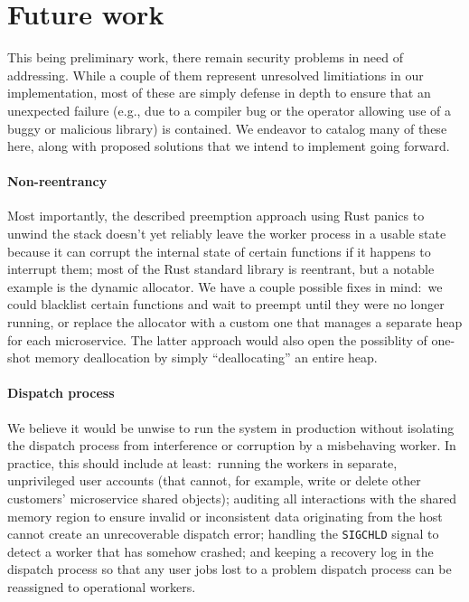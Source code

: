 \section{Future work}
\label{sec:future}

This being preliminary work, there remain security problems in need of addressing.
While a couple of them represent unresolved limitiations in our implementation, most
of these are simply defense in depth to ensure that an unexpected failure (e.g., due
to a compiler bug or the operator allowing use of a buggy or malicious library) is
contained.  We endeavor to catalog many of these here, along with proposed solutions
that we intend to implement going forward.

\paragraph{Non-reentrancy}
Most importantly, the described preemption approach using Rust panics to unwind the
stack doesn't yet reliably leave the worker process in a usable state because it
can corrupt the internal state of certain functions if it happens to interrupt them;
most of the Rust standard library is reentrant, but a notable example is the dynamic
allocator.  We have a couple possible fixes in mind:\ we could blacklist certain
functions and wait to preempt until they were no longer running, or replace the
allocator with a custom one that manages a separate heap for each microservice.  The
latter approach would also open the possiblity of one-shot memory deallocation by
simply ``deallocating'' an entire heap.

\paragraph{Dispatch process}
We believe it would be unwise to run the system in production without isolating the
dispatch process from interference or corruption by a misbehaving worker.  In
practice, this should include at least:\ running the workers in separate,
unprivileged user accounts (that cannot, for example, write or delete other
customers' microservice shared objects); auditing all interactions with the shared
memory region to ensure invalid or inconsistent data originating from the host cannot
create an unrecoverable dispatch error; handling the \texttt{SIGCHLD} signal to
detect a worker that has somehow crashed; and keeping a recovery log in the dispatch
process so that any user jobs lost to a problem dispatch process can be reassigned to
operational workers.

